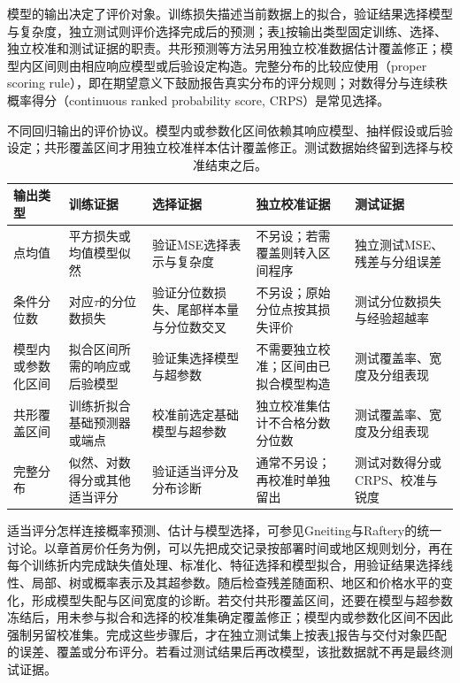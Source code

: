 模型的输出决定了评价对象。训练损失描述当前数据上的拟合，验证结果选择模型与复杂度，独立测试则评价选择完成后的预测；表\ref{tab:regression-evaluation-protocol}按输出类型固定训练、选择、独立校准和测试证据的职责。共形预测等方法另用独立校准数据估计覆盖修正；模型内区间则由相应响应模型或后验设定构造。完整分布的比较应使用（proper scoring rule），即在期望意义下鼓励报告真实分布的评分规则；对数得分与连续秩概率得分（continuous ranked probability score, CRPS）是常见选择。

\begin{table}[htbp]
  \centering
  \small
  \begin{tabularx}{\linewidth}{@{}>{\RaggedRight\arraybackslash}p{20mm}>{\RaggedRight\arraybackslash}X>{\RaggedRight\arraybackslash}X>{\RaggedRight\arraybackslash}X>{\RaggedRight\arraybackslash}X@{}}
    \toprule
    输出类型 & 训练证据 & 选择证据 & 独立校准证据 & 测试证据 \\
    \midrule
    点均值 & 平方损失或均值模型似然 & 验证MSE选择表示与复杂度 & 不另设；若需覆盖则转入区间程序 & 独立测试MSE、残差与分组误差 \\
    条件分位数 & 对应$\tau$的分位数损失 & 验证分位数损失、尾部样本量与分位数交叉 & 不另设；原始分位点按其损失评价 & 测试分位数损失与经验超越率 \\
    模型内或参数化区间 & 拟合区间所需的响应或后验模型 & 验证集选择模型与超参数 & 不需要独立校准；区间由已拟合模型构造 & 测试覆盖率、宽度及分组表现 \\
    共形覆盖区间 & 训练折拟合基础预测器或端点 & 校准前选定基础模型与超参数 & 独立校准集估计不合格分数分位数 & 测试覆盖率、宽度及分组表现 \\
    完整分布 & 似然、对数得分或其他适当评分 & 验证适当评分及分布诊断 & 通常不另设；再校准时单独留出 & 测试对数得分或CRPS、校准与锐度 \\
    \bottomrule
  \end{tabularx}
  \caption{不同回归输出的评价协议。模型内或参数化区间依赖其响应模型、抽样假设或后验设定；共形覆盖区间才用独立校准样本估计覆盖修正。测试数据始终留到选择与校准结束之后。}
  \label{tab:regression-evaluation-protocol}
\end{table}

适当评分怎样连接概率预测、估计与模型选择，可参见Gneiting与Raftery的统一讨论。以章首房价任务为例，可以先把成交记录按部署时间或地区规则划分，再在每个训练折内完成缺失值处理、标准化、特征选择和模型拟合，用验证结果选择线性、局部、树或概率表示及其超参数。随后检查残差随面积、地区和价格水平的变化，形成模型失配与区间宽度的诊断。若交付共形覆盖区间，还要在模型与超参数冻结后，用未参与拟合和选择的校准集确定覆盖修正；模型内或参数化区间不因此强制另留校准集。完成这些步骤后，才在独立测试集上按表\ref{tab:regression-evaluation-protocol}报告与交付对象匹配的误差、覆盖或分布评分。若看过测试结果后再改模型，该批数据就不再是最终测试证据。

